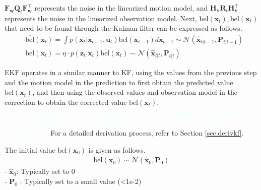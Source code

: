 \documentclass[10pt]{article}
\newcommand{\textbfazure}[1]{\textcolor{azure}{\textbf{#1}}}
\begin{document}
	 $\mathbf{F}_{\mathbf{w}}\mathbf{Q}_{t} \mathbf{F}_{\mathbf{w}}^{\intercal}$ represents the noise in the linearized motion model, and $\mathbf{H}_{\mathbf{v}}\mathbf{R}_{t} \mathbf{H}_{\mathbf{v}}^{\intercal}$ represents the noise in the linearized observation model. Next, $\overline{\text{bel}}(\mathbf{x}_{t}), \text{bel}(\mathbf{x}_{t})$ that need to be found through the Kalman filter can be expressed as follows.
	\begin{equation}
		\begin{aligned}
			& \overline{\text{bel}}(\mathbf{x}_{t}) = \int p(\mathbf{x}_{t} | \mathbf{x}_{t-1}, \mathbf{u}_{t})\text{bel}(\mathbf{x}_{t-1}) d \mathbf{x}_{t-1} \sim \mathcal{N}(\hat{\mathbf{x}}_{t|t-1}, \mathbf{P}_{t|t-1}) \\
			& \text{bel}(\mathbf{x}_{t}) = \eta \cdot p( \mathbf{z}_{t} |  \mathbf{x}_{t})\overline{\text{bel}}(\mathbf{x}_{t}) \sim \mathcal{N}(\hat{\mathbf{x}}_{t|t}, \mathbf{P}_{t|t})
		\end{aligned}
	\end{equation}
	
	 EKF operates in a similar manner to KF, using the values from the previous step and the motion model in the prediction to first obtain the predicted value $\overline{\text{bel}}(\mathbf{x}_{t})$, and then using the observed values and observation model in the correction to obtain the corrected value $\text{bel}(\mathbf{x}_{t})$. \textbfazure{Substitute $p(\mathbf{x}_{t} | \mathbf{x}_{t-1}, \mathbf{u}_{t})$, $p(\mathbf{z}_{t} | \mathbf{x}_{t})$ into the above equation to obtain the mean and covariance of the prediction and correction steps $(\hat{\mathbf{x}}_{t|t-1}, \mathbf{P}_{t|t-1}), (\hat{\mathbf{x}}_{t|t}, \mathbf{P}_{t|t})$ respectively.} For a detailed derivation process, refer to Section \ref{sec:derivkf}.
	
	 The initial value $\text{bel}(\mathbf{x}_{0})$ is given as follows.
	\begin{equation}
		\begin{aligned}
			\text{bel}(\mathbf{x}_{0}) \sim \mathcal{N}(\hat{\mathbf{x}}_{0}, \mathbf{P}_{0})
		\end{aligned}
	\end{equation}
	- $\hat{\mathbf{x}}_{0}$: Typically set to 0\\
	- $\mathbf{P}_{0}$ : Typically set to a small value (<1e-2)\\
	
\end{document}
